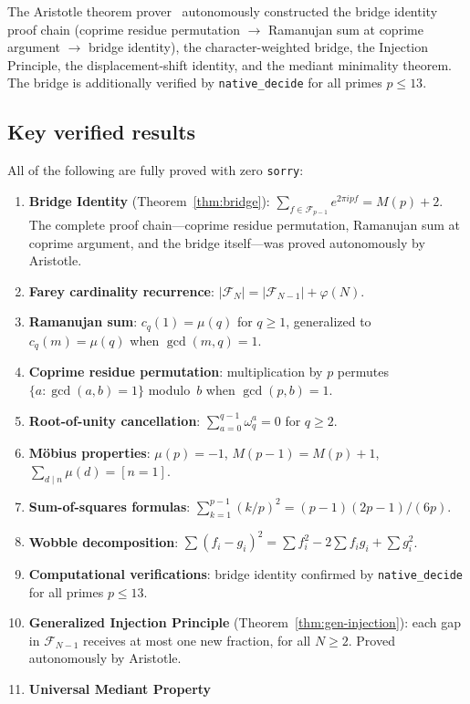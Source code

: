 \documentclass[11pt]{article}
\theoremstyle{definition}
\newcommand{\F}{\mathcal{F}}
\begin{document}
The Aristotle theorem prover~\cite{Aristotle2025}
autonomously constructed the bridge identity proof chain
(coprime residue permutation $\to$ Ramanujan sum at coprime
argument $\to$ bridge identity), the character-weighted
bridge, the Injection Principle, the displacement-shift
identity, and the mediant minimality theorem.
The bridge is additionally verified by
\texttt{native\_decide} for all primes $p \le 13$.

\subsection{Key verified results}

All of the following are fully proved with zero \texttt{sorry}:
\begin{enumerate}
  \item \textbf{Bridge Identity} (Theorem~\ref{thm:bridge}):
    $\sum_{f \in \F_{p-1}} e^{2\pi ipf} = M(p) + 2$.
    The complete proof chain---coprime residue permutation,
    Ramanujan sum at coprime argument, and the bridge
    itself---was proved autonomously by Aristotle.
  \item \textbf{Farey cardinality recurrence}:
    $|\F_N| = |\F_{N-1}| + \varphi(N)$.
  \item \textbf{Ramanujan sum}: $c_q(1) = \mu(q)$ for $q \ge 1$,
    generalized to $c_q(m) = \mu(q)$ when $\gcd(m,q) = 1$.
  \item \textbf{Coprime residue permutation}:
    multiplication by $p$ permutes $\{a : \gcd(a,b) = 1\}$
    modulo~$b$ when $\gcd(p,b) = 1$.
  \item \textbf{Root-of-unity cancellation}:
    $\sum_{a=0}^{q-1}\omega_q^a = 0$ for $q \ge 2$.
  \item \textbf{M\"obius properties}: $\mu(p) = -1$,
    $M(p-1) = M(p) + 1$, $\sum_{d \mid n}\mu(d) = [n=1]$.
  \item \textbf{Sum-of-squares formulas}:
    $\sum_{k=1}^{p-1}(k/p)^2 = (p-1)(2p-1)/(6p)$.
  \item \textbf{Wobble decomposition}:
    $\sum (f_i - g_i)^2 = \sum f_i^2 - 2\sum f_i g_i + \sum g_i^2$.
  \item \textbf{Computational verifications}:
    bridge identity confirmed by \texttt{native\_decide} for
    all primes $p \le 13$.
  \item \textbf{Generalized Injection Principle}
    (Theorem~\ref{thm:gen-injection}):
    each gap in $\F_{N-1}$ receives at most one new fraction,
    for all $N \ge 2$.  Proved autonomously by Aristotle.
  \item \textbf{Universal Mediant Property}

\end{enumerate}
\end{document}
